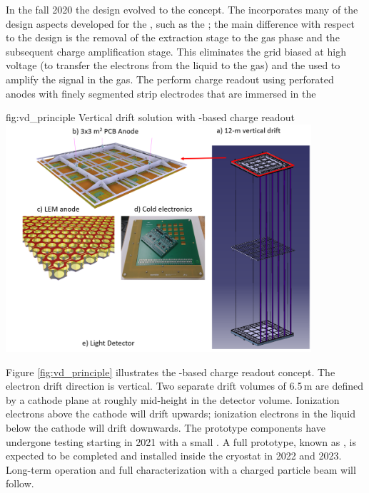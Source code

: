 \documentclass[../main-v1.tex]{subfiles}
\begin{document}
In the fall 2020 the  design evolved to the  concept. The  incorporates many of the design aspects developed for the , such as the ;   the  main  difference  with  respect  to  the    design  is   the  removal  of  the  extraction  stage  to  the  gas  phase  and  the  subsequent  charge  amplification  stage.  %
This eliminates the grid biased at high voltage (to transfer the electrons from the liquid to the gas) and the  used to amplify the signal in the gas. The   %
perform charge readout using %
perforated  anodes with finely segmented strip electrodes %
that are immersed in the 
 

\begin{dunefigure}
{fig:vd_principle}
{Vertical drift solution with -based charge readout}
\includegraphics[width=0.85\textwidth]{graphics/IntroFigures/Fig_13_VD_solution.png}
\end{dunefigure}

 Figure \ref{fig:vd_principle} illustrates the -based charge readout concept. The electron drift direction is vertical.
Two separate drift volumes of 6.5\,m are defined by a cathode plane at roughly mid-height in the
detector volume. Ionization electrons above the cathode will drift upwards; ionization electrons in the liquid below the cathode will drift downwards.
The   prototype components have undergone testing starting in 2021 with a small \coldbox.  A full prototype, known as , is expected to be completed and  installed 
 inside the  cryostat in 2022 and 2023. Long-term operation and full characterization with a charged particle beam will follow. 
\end{document}
